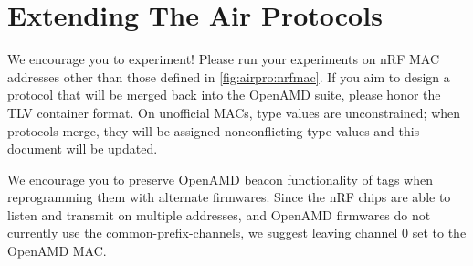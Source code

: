 \section{Extending The Air Protocols}

We encourage you to experiment!
Please run your experiments on
nRF MAC addresses
other than those defined in \autoref{fig:airpro:nrfmac}.
If you aim to design a protocol that
will be merged back into the OpenAMD suite,
please honor the TLV container format.
On unofficial MACs,
type values are unconstrained;
when protocols merge,
they will be assigned
nonconflicting type values
and this document will be updated.

We encourage you to preserve
OpenAMD beacon functionality of tags
when reprogramming them with alternate firmwares.
Since the nRF chips are able
to listen and transmit on multiple addresses,
and OpenAMD firmwares do not currently
use the common-prefix-channels,
we suggest leaving channel $0$
set to the OpenAMD MAC.
